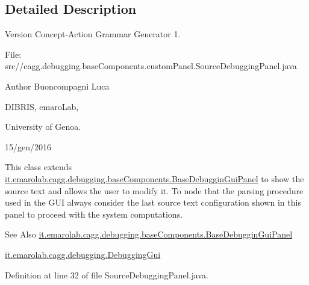\subsection{Detailed Description}
\begin{DoxyVersion}{Version}
Concept-\/\-Action Grammar Generator 1. \par
 File\-: src//cagg.debugging.\-base\-Components.\-custom\-Panel.\-Source\-Debugging\-Panel.\-java \par

\end{DoxyVersion}
\begin{DoxyAuthor}{Author}
Buoncompagni Luca \par
 D\-I\-B\-R\-I\-S, emaro\-Lab,\par
 University of Genoa. \par
 15/gen/2016 \par

\end{DoxyAuthor}


This class extends \hyperlink{classit_1_1emarolab_1_1cagg_1_1debugging_1_1baseComponents_1_1BaseDebugginGuiPanel}{it.\-emarolab.\-cagg.\-debugging.\-base\-Components.\-Base\-Debuggin\-Gui\-Panel} to show the source text and allows the user to modify it. To node that the parsing procedure used in the G\-U\-I always consider the last source text configuration shown in this panel to proceed with the system computations. 

\begin{DoxySeeAlso}{See Also}
\hyperlink{classit_1_1emarolab_1_1cagg_1_1debugging_1_1baseComponents_1_1BaseDebugginGuiPanel}{it.\-emarolab.\-cagg.\-debugging.\-base\-Components.\-Base\-Debuggin\-Gui\-Panel} 

\hyperlink{classit_1_1emarolab_1_1cagg_1_1debugging_1_1DebuggingGui}{it.\-emarolab.\-cagg.\-debugging.\-Debugging\-Gui} 
\end{DoxySeeAlso}


Definition at line 32 of file Source\-Debugging\-Panel.\-java.



